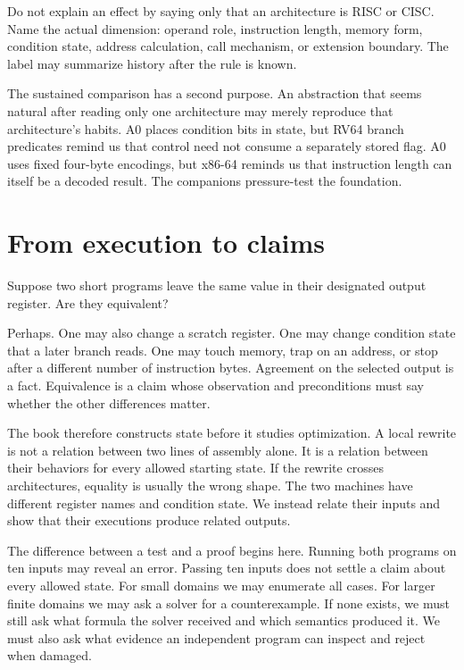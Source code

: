 \begin{warning}[title={Family labels are not causal explanations}]
Do not explain an effect by saying only that an architecture is RISC or CISC.
Name the actual dimension: operand role, instruction length, memory form,
condition state, address calculation, call mechanism, or extension boundary.
The label may summarize history after the rule is known.
\end{warning}

The sustained comparison has a second purpose. An abstraction that seems
natural after reading only one architecture may merely reproduce that
architecture's habits. A0 places condition bits in state, but RV64 branch
predicates remind us that control need not consume a separately stored flag.
A0 uses fixed four-byte encodings, but x86-64 reminds us that instruction
length can itself be a decoded result. The companions pressure-test the
foundation.

\section{From execution to claims}

Suppose two short programs leave the same value in their designated output
register. Are they equivalent?

Perhaps. One may also change a scratch register. One may change condition
state that a later branch reads. One may touch memory, trap on an address, or
stop after a different number of instruction bytes. Agreement on the selected
output is a fact. Equivalence is a claim whose observation and preconditions
must say whether the other differences matter.

The book therefore constructs state before it studies optimization. A local
rewrite is not a relation between two lines of assembly alone. It is a
relation between their behaviors for every allowed starting state. If the
rewrite crosses architectures, equality is usually the wrong shape. The two
machines have different register names and condition state. We instead relate
their inputs and show that their executions produce related outputs.

The difference between a test and a proof begins here. Running both programs
on ten inputs may reveal an error. Passing ten inputs does not settle a claim
about every allowed state. For small domains we may enumerate all cases. For
larger finite domains we may ask a solver for a counterexample. If none exists,
we must still ask what formula the solver received and which semantics produced
it. We must also ask what evidence an independent program can inspect and
reject when damaged.

